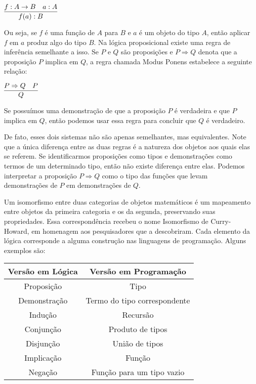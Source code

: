\documentclass[12pt, oneside, a4paper,english,brazil]{abntex2}
\begin{document}
\begin{center}
  $\infer{f(a) : B}{f : A \rightarrow B & a : A}$
\end{center}

\qquad Ou seja, se $f$ é uma função de $A$ para $B$ e $a$ é um objeto do tipo $A$, então aplicar
$f$ em $a$ produz algo do tipo $B$. Na lógica proposicional existe uma regra de inferência
semelhante a isso. Se $P$ e $Q$ são proposições e $P \Rightarrow Q$ denota que a proposição $P$ implica
em $Q$, a regra chamada Modus Ponens estabelece a seguinte relação:

\begin{center}
  $\infer{Q}{P \Rightarrow Q & P}$
\end{center}

\qquad Se possuímos uma demonstração de que a proposição $P$ é verdadeira e que $P$
implica em $Q$, então podemos usar essa regra para concluir que $Q$ é verdadeiro.

\qquad De fato, esses dois sistemas não são apenas semelhantes, mas equivalentes. Note
que a única diferença entre as duas regras é a natureza dos objetos aos quais elas se referem.
Se identificarmos proposições como tipos e demonstrações como termos de um determinado
tipo, então não existe diferença entre elas. Podemos interpretar a proposição $P \Rightarrow Q$ como
o tipo das funções que levam demonstrações de $P$ em demonstrações de $Q$.

\qquad Um isomorfismo entre duas categorias de objetos matemáticos é um mapeamento
entre objetos da primeira categoria e os da segunda, preservando suas propriedades.
Essa correspondência recebeu o nome Isomorfismo de Curry-Howard, em homenagem
aos pesquisadores que a descobriram. Cada elemento da lógica corresponde a alguma
construção nas linguagens de programação. Alguns exemplos são:
\begin{table}[H]
  \centering
    \begin{tabular}{cc}\toprule
      Versão em Lógica & Versão em Programação  \\\midrule
      Proposição & Tipo \\
      Demonstração & Termo do tipo correspondente \\
      Indução & Recursão \\
      Conjunção & Produto de tipos \\
      Disjunção & União de tipos \\
      Implicação & Função \\
      Negação & Função para um tipo vazio \\\bottomrule
    \end{tabular}
\end{table}
\end{document}
